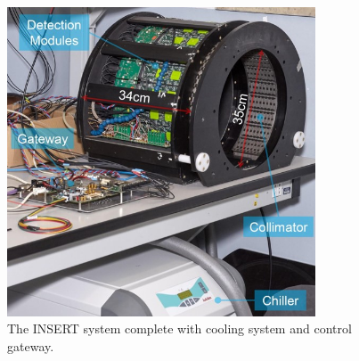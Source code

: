 \begin{figure}[!t]
\centering
\includegraphics[width=3.6in]{figures/insert_system.jpg}

    \caption{The INSERT system complete with cooling system and control gateway.} \label{fig:CompINSERT}
\end{figure}
